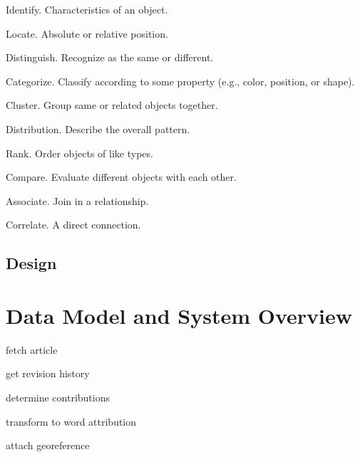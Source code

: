 \begin{todos}
    \item {}
    \item Identify. Characteristics of an object.
    \item Locate. Absolute or relative position.
    \item Distinguish. Recognize as the same or different.
    \item Categorize. Classify according to some property (e.g., color, position, or shape).
    \item Cluster. Group same or related objects together.
    \item Distribution. Describe the overall pattern.
    \item Rank. Order objects of like types.
    \item Compare. Evaluate different objects with each other.
    \item Associate. Join in a relationship.
    \item Correlate. A direct connection.
\end{todos}


\subsection{Design}


\section{Data Model and System Overview}

\begin{todos}
    \item fetch article
    \item get revision history
    \item determine contributions
    \item transform to word attribution
    \item attach georeference 
\end{todos}


